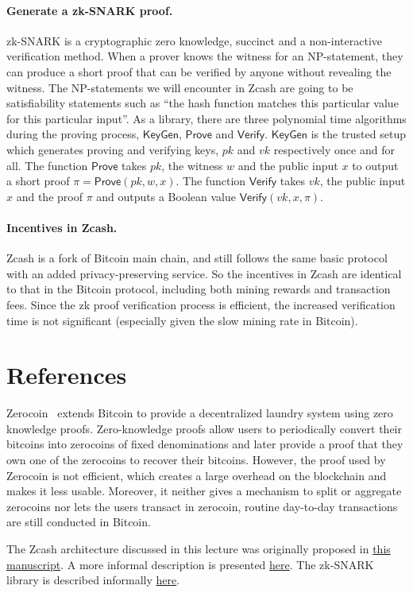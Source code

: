 \documentclass[a4paper]{article}
\newcommand{\prove}{\textsf{Prove}}
\newcommand{\verify}{\textsf{Verify}}
\begin{document}
\paragraph{Generate a  zk-SNARK proof.}  zk-SNARK is a cryptographic  zero knowledge, succinct and a non-interactive verification method. When a prover knows the witness for an NP-statement, they can produce a short proof that can be verified by anyone without revealing the witness. The NP-statements we will encounter in Zcash are going to be satisfiability statements such as ``the hash function matches this particular value for this particular input''. As a library, there are three polynomial time algorithms during the proving process, $\textsf{KeyGen}$, $\prove$ and $\verify$. $\textsf{KeyGen}$ is the trusted setup which generates proving and verifying keys, $pk$ and $vk$ respectively once and for all. The function $\prove$ takes $pk$, the witness $w$ and the public input $x$ to output a short proof $\pi = \prove(pk,w,x)$. The function $\verify$ takes $vk$, the public input $x$ and the proof $\pi$ and outputs a Boolean value $\verify(vk,x,\pi)$.




\paragraph{Incentives in Zcash.} Zcash is a fork of Bitcoin main chain, and still follows the same basic protocol with an added privacy-preserving service. So the incentives in Zcash are identical  to that in the Bitcoin protocol, including both mining rewards and  transaction fees. Since the zk proof verification process is efficient, the increased  verification time is not significant (especially given the slow mining rate in Bitcoin). 


\section*{References}
 Zerocoin~\cite{6547123} extends Bitcoin to provide a decentralized laundry system using zero knowledge proofs. Zero-knowledge proofs allow users to periodically convert their bitcoins into zerocoins of fixed denominations and later provide a proof that they own one of the zerocoins to recover their bitcoins. However, the proof used by Zerocoin is not efficient, which creates a large overhead on the blockchain and makes it less usable. Moreover, it neither gives a mechanism to split or aggregate zerocoins nor lets the users transact in zerocoin, routine day-to-day transactions are still conducted in Bitcoin.

The Zcash architecture discussed in this lecture was originally proposed in \href{https://eprint.iacr.org/2014/349}{this manuscript}. A more informal description is presented \href{https://z.cash/technology/}{here}. The zk-SNARK library is described informally \href{https://z.cash/technology/zksnarks/}{here}. 




\end{document}
